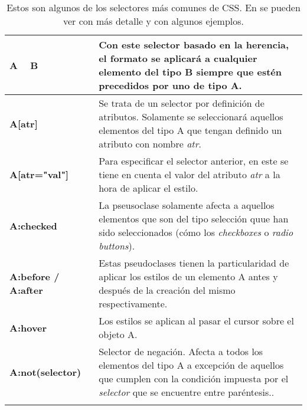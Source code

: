 \documentclass[../main.tex]{subfiles}
\begin{document}
\begin{longtable}{|| p{0.3\linewidth} | p{0.7\linewidth} ||}
            \textbf{A ~ B} & Con este selector basado en la herencia, el formato se aplicará a cualquier elemento del tipo B siempre que estén precedidos por uno de tipo A. \\ \hline
            
            \textbf{A[atr]} & Se trata de un selector por definición de atributos. Solamente se seleccionará aquellos elementos del tipo A que tengan definido un atributo con nombre \textit{atr}. \\ \hline
            
            \textbf{A[atr="val"]} & Para especificar el selector anterior, en este se tiene en cuenta el valor del atributo \textit{atr} a la hora de aplicar el estilo. \\ \hline
            
            \textbf{A:checked} & La pseusoclase solamente afecta a aquellos elementos que son del tipo selección quue han sido seleccionados (cómo los \textit{checkboxes} o \textit{radio buttons}). \\ \hline
            
            \textbf{A:before / A:after} & Estas pseudoclases tienen la particularidad de aplicar los estilos de un elemento A antes y después de la creación del mismo respectivamente. \\ \hline
            
            \textbf{A:hover} & Los estilos se aplican al pasar el cursor sobre el objeto A. \\ \hline
            
            \textbf{A:not(selector)} & Selector de negación. Afecta a todos los elementos del tipo A a excepción de aquellos que cumplen con la condición impuesta por el \textit{selector} que se encuentre entre paréntesis.. \\ \hline
            
            \caption{Estos son algunos de los selectores más comunes de  CSS. En \cite{selectoresCSS} se pueden ver con más detalle y con algunos ejemplos.}
            \label{selectores_css}
            
        \end{longtable}

        
        
    
        




   
\end{document}
